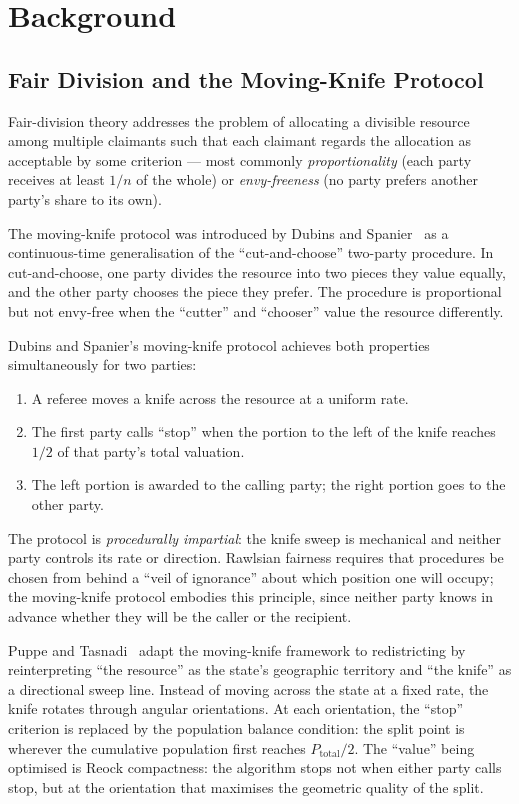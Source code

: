 \section{Background}
\label{sec:background}

\subsection{Fair Division and the Moving-Knife Protocol}

Fair-division theory addresses the problem of allocating a divisible resource
among multiple claimants such that each claimant regards the allocation as
acceptable by some criterion --- most commonly \emph{proportionality} (each
party receives at least $1/n$ of the whole) or \emph{envy-freeness} (no party
prefers another party's share to its own).

The moving-knife protocol was introduced by Dubins and
Spanier~\citeyear{dubins1961} as a continuous-time generalisation of the
``cut-and-choose'' two-party procedure.
In cut-and-choose, one party divides the resource into two pieces they value
equally, and the other party chooses the piece they prefer.
The procedure is proportional but not envy-free when the ``cutter'' and
``chooser'' value the resource differently.

Dubins and Spanier's moving-knife protocol achieves both properties
simultaneously for two parties:
\begin{enumerate}
\item A referee moves a knife across the resource at a uniform rate.
\item The first party calls ``stop'' when the portion to the left of the knife
  reaches $1/2$ of that party's total valuation.
\item The left portion is awarded to the calling party; the right portion
  goes to the other party.
\end{enumerate}
The protocol is \emph{procedurally impartial}: the knife sweep is mechanical
and neither party controls its rate or direction.
Rawlsian fairness requires that procedures be chosen from behind a ``veil of
ignorance'' about which position one will occupy; the moving-knife protocol
embodies this principle, since neither party knows in advance whether they
will be the caller or the recipient.

Puppe and Tasnadi~\citeyear{puppe2026} adapt the moving-knife framework to
redistricting by reinterpreting ``the resource'' as the state's geographic
territory and ``the knife'' as a directional sweep line.
Instead of moving across the state at a fixed rate, the knife rotates through
angular orientations.
At each orientation, the ``stop'' criterion is replaced by the population
balance condition: the split point is wherever the cumulative population
first reaches $P_{\mathrm{total}}/2$.
The ``value'' being optimised is Reock compactness: the algorithm stops
not when either party calls stop, but at the orientation that maximises
the geometric quality of the split.

